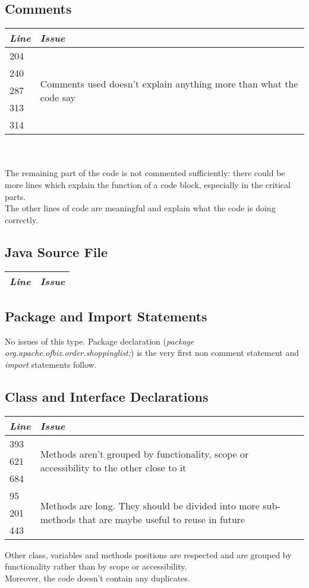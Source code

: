 \documentclass[11pt,a4paper]{report}
\begin{document}
\subsection{Comments}
\begin{tabularx}{\textwidth}{|l|X|}
	\hline
	\textit{Line} & \textit{Issue}\\
	\hline
	204 & \multirow{5}{*}{Comments used doesn't explain anything more than what the code say}\\
	240 & \\
	287 & \\
	313 & \\
	314 & \\
	\hline
\end{tabularx}
\\\\
The remaining part of the code is not commented sufficiently: there could be more lines which explain the function of a code block, especially in the critical parts.\\The other lines of code are meaningful and explain what the code is doing correctly.
\subsection{Java Source File}
\begin{tabularx}{\textwidth}{|l|X|}
	\hline
	\textit{Line} & \textit{Issue}\\
	\hline
\end{tabularx}
\subsection{Package and Import Statements}
No issues of this type. Package declaration (\textit{package org.apache.ofbiz.order.shoppinglist;}) is the very first non comment statement and \textit{import} statements follow.
\subsection{Class and Interface Declarations}
\begin{tabularx}{\textwidth}{|l|X|}
	\hline
	\textit{Line} & \textit{Issue}\\
	\hline
	393 & \multirow{3}{*}{Methods aren't grouped by functionality, scope or accessibility to the other close to it}\\
	621 & \\
	684 & \\
	\hline
	95 & \multirow{3}{*}{Methods are long. They should be divided into more sub-methods that are maybe useful to reuse in future}\\
	201 & \\
	443 & \\
	\hline
\end{tabularx}
Other class, variables and methods positions are respected and are grouped by functionality rather than by scope or accessibility.\\Moreover, the code doesn't contain any duplicates.
\end{document}
